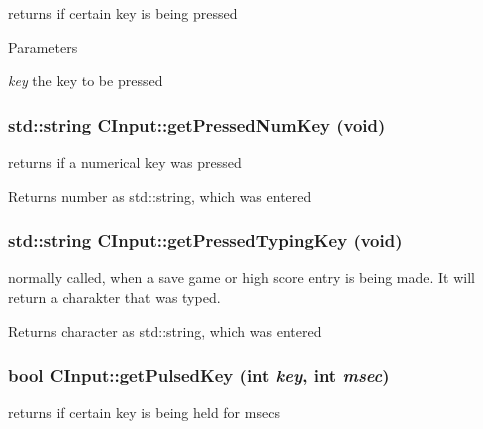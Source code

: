 returns if certain key is being pressed 


\begin{DoxyParams}{Parameters}
\item[{\em key}]the key to be pressed \end{DoxyParams}
\hypertarget{class_c_input_a6c6b514e6ace12a26f232c6d87af6b65}{
\subsubsection[{getPressedNumKey}]{\setlength{\rightskip}{0pt plus 5cm}std::string CInput::getPressedNumKey (void)}}
\label{class_c_input_a6c6b514e6ace12a26f232c6d87af6b65}


returns if a numerical key was pressed 

\begin{DoxyReturn}{Returns}
number as std::string, which was entered 
\end{DoxyReturn}
\hypertarget{class_c_input_abf9c66d7c259956419d89921fcda458d}{
\subsubsection[{getPressedTypingKey}]{\setlength{\rightskip}{0pt plus 5cm}std::string CInput::getPressedTypingKey (void)}}
\label{class_c_input_abf9c66d7c259956419d89921fcda458d}


normally called, when a save game or high score entry is being made. It will return a charakter that was typed. 

\begin{DoxyReturn}{Returns}
character as std::string, which was entered 
\end{DoxyReturn}
\hypertarget{class_c_input_a5bd7ad2f5a50cdcc159d3dae929a563e}{
\subsubsection[{getPulsedKey}]{\setlength{\rightskip}{0pt plus 5cm}bool CInput::getPulsedKey (int {\em key}, \/  int {\em msec})}}
\label{class_c_input_a5bd7ad2f5a50cdcc159d3dae929a563e}


returns if certain key is being held for msecs 


